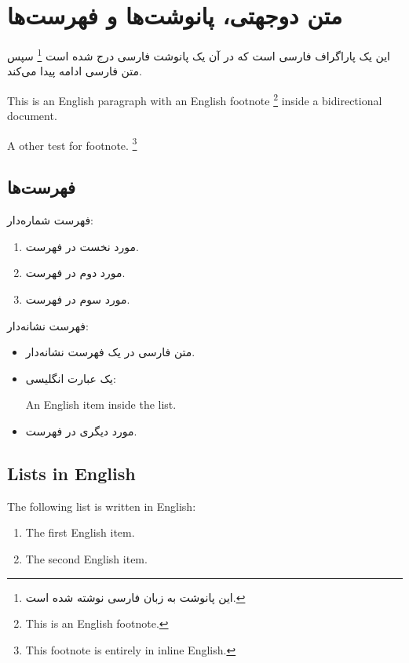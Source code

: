 \documentclass{article}
\begin{document}
    \section{متن دوجهتی، پانوشت‌ها و فهرست‌ها}

    این یک پاراگراف فارسی است که در آن یک پانوشت فارسی درج شده است%
    \footnote{این پانوشت به زبان فارسی نوشته شده است.} سپس متن فارسی ادامه
    پیدا می‌کند.



       \begin{latin}
        This is an English paragraph with an English footnote%
        \footnote{This is an English footnote.}
        inside a bidirectional document.
    \end{latin}


      \hfill \foreignlanguage{english}{ A other test for footnote.
        \footnote{%
            This footnote is entirely in inline English.
        }
    }

    \subsection{فهرست‌ها}

    فهرست شماره‌دار:

    \begin{enumerate}
        \item مورد نخست در فهرست.
        \item مورد دوم در فهرست.
        \item مورد سوم در فهرست.
    \end{enumerate}

    فهرست نشانه‌دار:

    \begin{itemize}
        \item متن فارسی در یک فهرست نشانه‌دار.
        \item یک عبارت انگلیسی:
        \begin{otherlanguage}{english}
            An English item inside the list.
        \end{otherlanguage}
        \item مورد دیگری در فهرست.
    \end{itemize}

    \begin{otherlanguage}{english}
        \subsection{Lists in English}

        The following list is written in English:

        \begin{enumerate}
            \item The first English item.
            \item The second English item.
        \end{enumerate}
    \end{otherlanguage}
\end{document}
